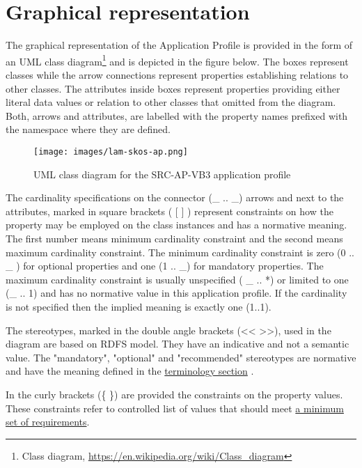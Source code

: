 
\section{Graphical representation}
\label{ariaid-title1}

The graphical representation of the Application Profile is provided in
the form of an UML class
diagram\footnote{Class diagram,
	\url{https://en.wikipedia.org/wiki/Class_diagram}} and is depicted
in the figure below. The boxes represent classes while the arrow
connections represent properties establishing relations to other
classes. The attributes inside boxes represent properties providing
either literal data values or relation to other classes that omitted
from the diagram. Both, arrows and attributes, are labelled with the
property names prefixed with the namespace where they are defined.

\begin{figure}[!ht]
	\centering
	\texttt{[image: images/lam-skos-ap.png]}
	\caption{UML class diagram for the SRC-AP-VB3 application profile}
\end{figure}

The cardinality specifications on the connector (\_ .. \_) arrows and
next to the attributes, marked in square brackets ( {[} {]} ) represent
constraints on how the property may be employed on the class instances
and has a normative meaning. The first number means minimum cardinality
constraint and the second means maximum cardinality constraint. The
minimum cardinality constraint is zero (0 .. \_ ) for optional
properties and one (1 .. \_) for mandatory properties. The maximum
cardinality constraint is usually unspecified ( \_ .. *) or limited to
one (\_ .. 1) and has no normative value in this application profile. If
the cardinality is not specified then the implied meaning is exactly one
(1..1).

The stereotypes, marked in the double angle brackets
(\textless{}\textless{} \textgreater{}\textgreater{}), used in the
diagram are based on RDFS model. They have an indicative and not a
semantic value. The "mandatory", "optional" and "recommended"
stereotypes are normative and have the meaning defined in the
\href{ap-terminology.html\#ap-terminology}{terminology section} .

In the curly brackets (\{ \}) are provided the constraints on the
property values. These constraints refer to controlled list of values
that should meet \href{ap-controlled-vocabulary-requirements.html}{a
minimum set of requirements}.


